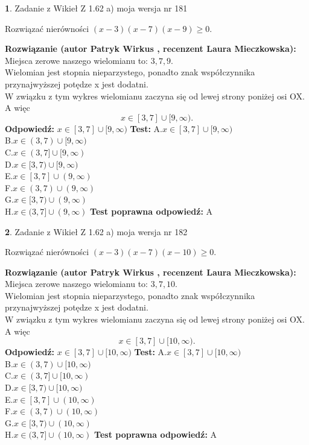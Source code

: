 \documentclass[12pt, a4paper]{article}
\theoremstyle{definition} %
\newtheorem{zad}{}
\newcommand{\zadStart}[1]{\begin{zad}#1\newline}
\newcommand{\zadStop}{\end{zad}}
\newcommand{\rozwStart}[2]{\noindent \textbf{Rozwiązanie (autor #1 , recenzent #2): }\newline}
\newcommand{\rozwStop}{\newline}
\newcommand{\odpStart}{\noindent \textbf{Odpowiedź:}\newline}
\newcommand{\odpStop}{\newline}
\newcommand{\testStart}{\noindent \textbf{Test:}\newline}
\newcommand{\testStop}{\newline}
\newcommand{\kluczStart}{\noindent \textbf{Test poprawna odpowiedź:}\newline}
\newcommand{\kluczStop}{\newline}
\begin{document}
\zadStart{Zadanie z Wikieł Z 1.62 a) moja wersja nr 181}

Rozwiązać nierówności $(x-3)(x-7)(x-9)\ge0$.
\zadStop
\rozwStart{Patryk Wirkus}{Laura Mieczkowska}
Miejsca zerowe naszego wielomianu to: $3, 7, 9$.\\
Wielomian jest stopnia nieparzystego, ponadto znak współczynnika przy\linebreak najwyższej potędze x jest dodatni.\\ W związku z tym wykres wielomianu zaczyna się od lewej strony poniżej osi OX. A więc $$x \in [3,7] \cup [9,\infty).$$
\rozwStop
\odpStart
$x \in [3,7] \cup [9,\infty)$
\odpStop
\testStart
A.$x \in [3,7] \cup [9,\infty)$\\
B.$x \in (3,7) \cup [9,\infty)$\\
C.$x \in (3,7] \cup [9,\infty)$\\
D.$x \in [3,7) \cup [9,\infty)$\\
E.$x \in [3,7] \cup (9,\infty)$\\
F.$x \in (3,7) \cup (9,\infty)$\\
G.$x \in [3,7) \cup (9,\infty)$\\
H.$x \in (3,7] \cup (9,\infty)$
\testStop
\kluczStart
A
\kluczStop



\zadStart{Zadanie z Wikieł Z 1.62 a) moja wersja nr 182}

Rozwiązać nierówności $(x-3)(x-7)(x-10)\ge0$.
\zadStop
\rozwStart{Patryk Wirkus}{Laura Mieczkowska}
Miejsca zerowe naszego wielomianu to: $3, 7, 10$.\\
Wielomian jest stopnia nieparzystego, ponadto znak współczynnika przy\linebreak najwyższej potędze x jest dodatni.\\ W związku z tym wykres wielomianu zaczyna się od lewej strony poniżej osi OX. A więc $$x \in [3,7] \cup [10,\infty).$$
\rozwStop
\odpStart
$x \in [3,7] \cup [10,\infty)$
\odpStop
\testStart
A.$x \in [3,7] \cup [10,\infty)$\\
B.$x \in (3,7) \cup [10,\infty)$\\
C.$x \in (3,7] \cup [10,\infty)$\\
D.$x \in [3,7) \cup [10,\infty)$\\
E.$x \in [3,7] \cup (10,\infty)$\\
F.$x \in (3,7) \cup (10,\infty)$\\
G.$x \in [3,7) \cup (10,\infty)$\\
H.$x \in (3,7] \cup (10,\infty)$
\testStop
\kluczStart
A
\kluczStop
\end{document}
